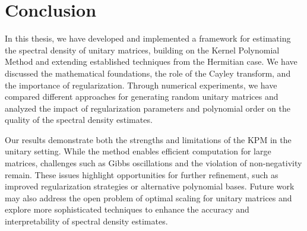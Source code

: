 \section{Conclusion}

In this thesis, we have developed and implemented a framework for estimating the spectral density of unitary matrices, building on the Kernel Polynomial Method and extending established techniques from the Hermitian case. We have discussed the mathematical foundations, the role of the Cayley transform, and the importance of regularization. Through numerical experiments, we have compared different approaches for generating random unitary matrices and analyzed the impact of regularization parameters and polynomial order on the quality of the spectral density estimates.

Our results demonstrate both the strengths and limitations of the KPM in the unitary setting. While the method enables efficient computation for large matrices, challenges such as Gibbs oscillations and the violation of non-negativity remain. These issues highlight opportunities for further refinement, such as improved regularization strategies or alternative polynomial bases. Future work may also address the open problem of optimal scaling for unitary matrices and explore more sophisticated techniques to enhance the accuracy and interpretability of spectral density estimates.